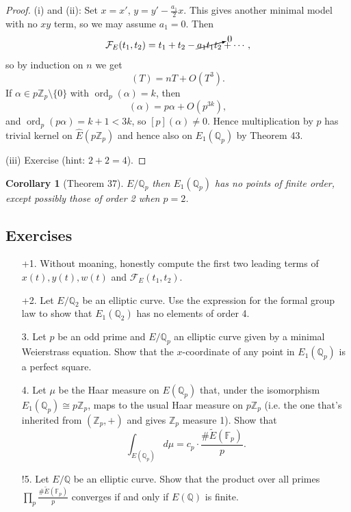 \documentclass[a4paper]{article}
\newtheorem{corollary}[theorem]{Corollary}
\theoremstyle{definition}
\DeclareMathOperator{\ord}{ord}
\newcommand{\calF}{\mathcal{F}}
\newcommand{\F}{\mathbb{F}}
\newcommand{\Z}{\mathbb{Z}}
\newcommand{\Q}{\mathbb{Q}}
\begin{document}
\begin{proof}
    (i) and (ii): Set $x=x'$, $y=y'-\frac{a_1}{2}x$. This gives another minimal
    model with no $xy$ term, so we may assume $a_1=0$. Then
    \begin{equation*}
        \calF_E(t_1,t_2) = t_1+t_2 - \cancelto{0}{a_1t_1t_2} + \cdots,
    \end{equation*}
    so by induction on $n$ we get
    \begin{equation*}
        [n](T)=nT + O(T^3).
    \end{equation*}
    If $\alpha\in p\Z_p\setminus\{0\}$ with $\ord_p(\alpha)=k$, then
    \begin{equation*}
        [p](\alpha) = p\alpha + O(p^{3k}),
    \end{equation*}
    and $\ord_p(p\alpha)=k+1<3k$, so $[p](\alpha)\ne0$. Hence multiplication by
    $p$ has trivial kernel on $\hat E(p\Z_p)$ and hence also on $E_1(\Q_p)$ by
    Theorem 43.

    (iii) Exercise (hint: $2+2=4$).
\end{proof}

\begin{corollary}[Theorem 37]
    $E/\Q_p$ then $E_1(\Q_p)$ has no points of finite order, except possibly
    those of order 2 when $p=2$.
\end{corollary}

\subsection*{Exercises}

\begin{enumerate}
    \item[+1.]  Without moaning, honestly compute the first two leading terms of
        $x(t),y(t),w(t)$ and $\calF_E(t_1,t_2)$.

    \item[+2.]  Let $E/\Q_2$ be an elliptic curve. Use the expression for the
        formal group law to show that $E_1(\Q_2)$ has no elements of order 4.

    \item[3.] Let $p$ be an odd prime and $E/\Q_p$ an elliptic curve given by a
        minimal Weierstrass equation. Show that the $x$-coordinate of any point
        in $E_1(\Q_p)$ is a perfect square.

    \item[4.] Let $\mu$ be the Haar measure on $E(\Q_p)$ that, under the
        isomorphism $E_1(\Q_p)\cong p\Z_p$, maps to the usual Haar measure on
        $p\Z_p$ (i.e. the one that's inherited from $(\Z_p,+)$ and gives $\Z_p$ 
        measure 1). Show that
        \begin{equation*}
            \int_{E(\Q_p)}d\mu = c_p\cdot\frac{\#\tilde E(\F_p)}{p}.
        \end{equation*}

    \item[!5.] Let $E/\Q$ be an elliptic curve. Show that the product over all
        primes $\prod_p\frac{\#\tilde E(\F_p)}{p}$ converges if and only if
        $E(\Q)$ is finite.
\end{enumerate}
\end{document}
